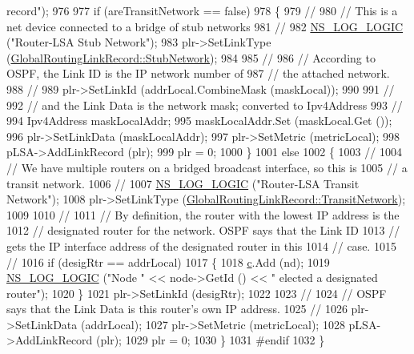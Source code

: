 \begin{DoxyCode}
{       record"});
976 
977   \textcolor{keywordflow}{if} (areTransitNetwork == \textcolor{keyword}{false})
978     \{
979       \textcolor{comment}{//}
980       \textcolor{comment}{// This is a net device connected to a bridge of stub networks}
981       \textcolor{comment}{//}
982       \hyperlink{group__logging_ga88acd260151caf2db9c0fc84997f45ce}{NS\_LOG\_LOGIC} (\textcolor{stringliteral}{"Router-LSA Stub Network"});
983       plr->SetLinkType (\hyperlink{classns3_1_1GlobalRoutingLinkRecord_a9380bcce9bca03943c4761b166a694f4a183ff8c880e05253fdca7bece2cad90b}{GlobalRoutingLinkRecord::StubNetwork});
984 
985       \textcolor{comment}{// }
986       \textcolor{comment}{// According to OSPF, the Link ID is the IP network number of }
987       \textcolor{comment}{// the attached network.}
988       \textcolor{comment}{//}
989       plr->SetLinkId (addrLocal.CombineMask (maskLocal));
990 
991       \textcolor{comment}{//}
992       \textcolor{comment}{// and the Link Data is the network mask; converted to Ipv4Address}
993       \textcolor{comment}{//}
994       Ipv4Address maskLocalAddr;
995       maskLocalAddr.Set (maskLocal.Get ());
996       plr->SetLinkData (maskLocalAddr);
997       plr->SetMetric (metricLocal);
998       pLSA->AddLinkRecord (plr);
999       plr = 0;
1000     \}
1001   \textcolor{keywordflow}{else}
1002     \{
1003       \textcolor{comment}{//}
1004       \textcolor{comment}{// We have multiple routers on a bridged broadcast interface, so this is}
1005       \textcolor{comment}{// a transit network.}
1006       \textcolor{comment}{//}
1007       \hyperlink{group__logging_ga88acd260151caf2db9c0fc84997f45ce}{NS\_LOG\_LOGIC} (\textcolor{stringliteral}{"Router-LSA Transit Network"});
1008       plr->SetLinkType (\hyperlink{classns3_1_1GlobalRoutingLinkRecord_a9380bcce9bca03943c4761b166a694f4ad3d00014c9ba50539a53b55fce117856}{GlobalRoutingLinkRecord::TransitNetwork});
1009 
1010       \textcolor{comment}{// }
1011       \textcolor{comment}{// By definition, the router with the lowest IP address is the}
1012       \textcolor{comment}{// designated router for the network.  OSPF says that the Link ID}
1013       \textcolor{comment}{// gets the IP interface address of the designated router in this }
1014       \textcolor{comment}{// case.}
1015       \textcolor{comment}{//}
1016       \textcolor{keywordflow}{if} (desigRtr == addrLocal) 
1017         \{
1018           \hyperlink{lte_2model_2fading-traces_2fading__trace__generator_8m_ae0323a9039add2978bf5b49550572c7c}{c}.Add (nd);
1019           \hyperlink{group__logging_ga88acd260151caf2db9c0fc84997f45ce}{NS\_LOG\_LOGIC} (\textcolor{stringliteral}{"Node "} << node->GetId () << \textcolor{stringliteral}{" elected a designated router"});
1020         \}
1021       plr->SetLinkId (desigRtr);
1022 
1023       \textcolor{comment}{//}
1024       \textcolor{comment}{// OSPF says that the Link Data is this router's own IP address.}
1025       \textcolor{comment}{//}
1026       plr->SetLinkData (addrLocal);
1027       plr->SetMetric (metricLocal);
1028       pLSA->AddLinkRecord (plr);
1029       plr = 0;
1030     \}
1031 \textcolor{preprocessor}{#endif}
1032 \}
\end{DoxyCode}



